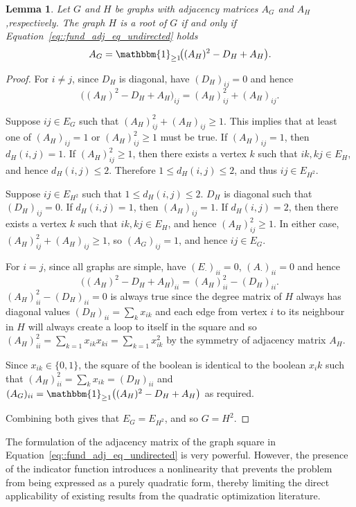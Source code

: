 \documentclass[11pt]{report}
\newtheorem{lemma}{Lemma}
\begin{document}
\begin{lemma} \label{lemma::G_equal_to_H^2}
  Let $G$ and $H$ be graphs with adjacency matrices $A_G$ and $A_H$,respectively. The graph $H$ is a root of $G$ if and only if 
  Equation~\ref{eq::fund_adj_eq_undirected} holds
  \[ 
  A_G = \mathbbm{1}_{\geq 1}\!\big((A_H)^2 - D_H + A_H\big).
  \]
\end{lemma}
\begin{proof} 
  For $i \neq j$, since $D_H$ is diagonal, have $(D_H)_{ij} = 0$ and hence
  \[
  \big((A_H)^2 - D_H + A_H\big)_{ij} = (A_H)^2_{ij} + (A_H)_{ij}.
  \]

  Suppose $ij \in E_G$ such that $(A_H)^2_{ij} + (A_H)_{ij} \geq 1$. This implies that at least one of $(A_H)_{ij} = 1$ or $(A_H)^2_{ij} \geq 1$ must be true. If $(A_H)_{ij} = 1$, then $d_H(i,j) = 1$.  If $(A_H)^2_{ij} \geq 1$, then there exists a vertex $k$ such that $ik, kj \in E_H$, and hence $d_H(i,j) \leq 2$. Therefore $1 \leq d_H(i,j) \leq 2$, and thus $ij \in E_{H^2}$.

  Suppose $ij \in E_{H^2}$ such that $1 \leq d_H(i,j) \leq 2$. $D_H$ is diagonal such that $(D_H)_{ij} = 0$. If $d_H(i,j) = 1$, then $(A_H)_{ij} = 1$. If $d_H(i,j) = 2$, then there exists a vertex $k$ such that $ik, kj \in E_H$, and hence $(A_H)^2_{ij} \geq 1$. In either case, $(A_H)^2_{ij} + (A_H)_{ij} \geq 1$, so $(A_G)_{ij} = 1$, and hence $ij \in E_G$.

  For $i = j$, since all graphs are simple, have $(E_{\cdot})_{ii} = 0$, $(A_{\cdot})_{ii} = 0$ and hence
  \[
  \big((A_H)^2 - D_H + A_H\big)_{ii} = (A_H)^2_{ii} - (D_H)_{ii}.
  \]
  $(A_H)^2_{ii} - (D_H)_{ii} = 0$ is always true since the degree matrix of $H$ always has diagonal values $\displaystyle (D_H)_{ii} = \sum_k x_{ik}$ and each edge from vertex $i$ to its neighbour in $H$ will always create a loop to itself in the square and so $\displaystyle (A_H)^2_{ii} = 
  \sum_{k = 1} x_{ik}x_{ki} = \sum_{k = 1} x_{ik}^2$ by the symmetry of adjacency matrix $A_H$. 
  
  Since $x_{ik} \in \{0, 1\}$, the square of the boolean is identical to the boolean $x_ik$ such that $\displaystyle (A_H)^2_{ii} = \sum_k x_{ik} = (D_H)_{ii}$ and $(A_G)_{ii} = \mathbbm{1}_{\geq 1}\big((A_H)^2 - D_H + A_H\big)$ as required. 

  Combining both gives that $E_G = E_{H^2}$, and so $G = H^2$.  
\end{proof}

The formulation of the adjacency matrix of the graph square in Equation~\eqref{eq::fund_adj_eq_undirected} is very powerful. However, the presence of the indicator function introduces a nonlinearity that prevents the problem from being expressed as a purely quadratic form, thereby limiting the direct applicability of existing results from the quadratic optimization literature.
\end{document}

